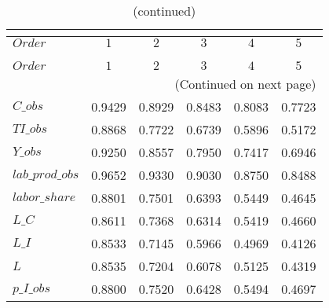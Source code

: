  
\begin{center}
\begin{longtable}{lccccc} 
\caption{COEFFICIENTS OF AUTOCORRELATION}\\
 \label{Table:th_autocorr_matrix}\\
\toprule 
$Order           $	 & 	 $         1$	 & 	 $         2$	 & 	 $         3$	 & 	 $         4$	 & 	 $         5$\\
\midrule \endfirsthead 
\caption{(continued)}\\
 \toprule \\ 
$Order           $	 & 	 $         1$	 & 	 $         2$	 & 	 $         3$	 & 	 $         4$	 & 	 $         5$\\
\midrule \endhead 
\midrule \multicolumn{6}{r}{(Continued on next page)} \\ \bottomrule \endfoot 
\bottomrule \endlastfoot 
$C\_obs          $	 & 	    0.9429	 & 	    0.8929	 & 	    0.8483	 & 	    0.8083	 & 	    0.7723 \\ 
$TI\_obs         $	 & 	    0.8868	 & 	    0.7722	 & 	    0.6739	 & 	    0.5896	 & 	    0.5172 \\ 
$Y\_obs          $	 & 	    0.9250	 & 	    0.8557	 & 	    0.7950	 & 	    0.7417	 & 	    0.6946 \\ 
$lab\_prod\_obs  $	 & 	    0.9652	 & 	    0.9330	 & 	    0.9030	 & 	    0.8750	 & 	    0.8488 \\ 
$labor\_share    $	 & 	    0.8801	 & 	    0.7501	 & 	    0.6393	 & 	    0.5449	 & 	    0.4645 \\ 
$L\_C            $	 & 	    0.8611	 & 	    0.7368	 & 	    0.6314	 & 	    0.5419	 & 	    0.4660 \\ 
$L\_I            $	 & 	    0.8533	 & 	    0.7145	 & 	    0.5966	 & 	    0.4969	 & 	    0.4126 \\ 
$L               $	 & 	    0.8535	 & 	    0.7204	 & 	    0.6078	 & 	    0.5125	 & 	    0.4319 \\ 
$p\_I\_obs       $	 & 	    0.8800	 & 	    0.7520	 & 	    0.6428	 & 	    0.5494	 & 	    0.4697 \\ 
\end{longtable}
 \end{center}
